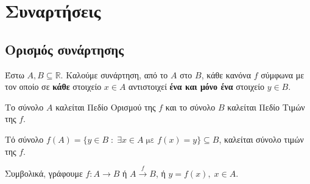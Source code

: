 \documentclass[a4paper,table]{report}
\begin{document}
\setcounter{chapter}{3}

\chapter{Συναρτήσεις}

\section{Ορισμός συνάρτησης}

\begin{dfn}
  Έστω $ A, B \subseteq \mathbb{R} $. Καλούμε \textcolor{Col1}{συνάρτηση}, από το $A$ 
  στο $B$, κάθε κανόνα $f$ σύμφωνα με τον οποίο σε \textbf{κάθε} στοιχείο $ x \in A $ 
  αντιστοιχεί \textbf{ένα και μόνο ένα} στοιχείο $ y \in B $. 
  \begin{myitemize}
    \item Το σύνολο $A$ καλείται \textcolor{Col1}{Πεδίο Ορισμού} της $f$ και το σύνολο 
      $B$ καλείται \textcolor{Col1}{Πεδίο Τιμών} της $f$.
    \item Τό σύνολο $ f(A) = \{ y \in B \; : \; \exists x \in A \; \text{με} 
      \; f(x)=y \} \subseteq B $, καλείται \textcolor{Col1}{σύνολο τιμών} της $f$.
  \end{myitemize}

  Συμβολικά, γράφουμε $ f \colon A \to B $ ή $ A \xrightarrow{f} B $, 
  ή $ y=f(x), \; x \in A $.  
\end{dfn}
\end{document}
